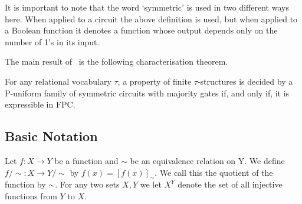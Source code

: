 \documentclass[../paper.tex]{subfiles}
\begin{document}
It is important to note that the word `symmetric' is used in two different ways
here. When applied to a circuit the above definition is used, but when applied
to a Boolean function it denotes a function whose output depends only on the
number of 1's in its input.

The main result of~\cite{AndersonD17} is the following characterisation theorem.

\begin{thm}
  For any relational vocabulary $\tau$, a property of finite $\tau$-structures
  is decided by a P-uniform family of symmetric circuits with majority gates if,
  and only if, it is expressible in FPC.
\end{thm}

\subsection{Basic Notation}

Let $f : X \rightarrow Y$ be a function and $\sim$ be an equivalence relation on Y. We define $f/{\sim} : X \rightarrow Y/{\sim}$ by $f(x) = [f(x)]_{\sim}$. We call this the quotient of the function by $\sim$. For any two sets $X, Y$ we let $X^{\underline{Y}}$ denote the set of all injective functions from $Y$ to $X$.
\end{document}
